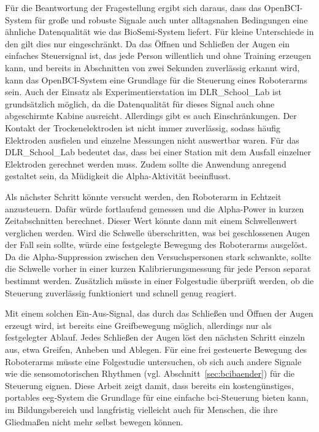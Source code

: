 Für die Beantwortung der Fragestellung ergibt sich daraus, dass das OpenBCI-System für große und robuste Signale auch unter alltagsnahen Bedingungen eine ähnliche Datenqualität wie das BioSemi-System liefert. Für kleine Unterschiede in den  gilt dies nur eingeschränkt. Da das Öffnen und Schließen der Augen ein einfaches Steuersignal ist, das jede Person willentlich und ohne Training erzeugen kann, und bereits in Abschnitten von zwei Sekunden zuverlässig erkannt wird, kann das OpenBCI-System eine Grundlage für die Steuerung eines Roboterarms sein. Auch der Einsatz als Experimentierstation im DLR\_\allowbreak School\_\allowbreak Lab ist grundsätzlich möglich, da die Datenqualität für dieses Signal auch ohne abgeschirmte Kabine ausreicht. Allerdings gibt es auch Einschränkungen. Der Kontakt der Trockenelektroden ist nicht immer zuverlässig, sodass häufig Elektroden ausfielen und einzelne Messungen nicht auswertbar waren. Für das DLR\_\allowbreak School\_\allowbreak Lab bedeutet das, dass bei einer Station mit dem Ausfall einzelner Elektroden gerechnet werden muss. Zudem sollte die Anwendung anregend gestaltet sein, da Müdigkeit die Alpha-Aktivität beeinflusst.

Als nächster Schritt könnte versucht werden, den Roboterarm in Echtzeit anzusteuern. Dafür würde fortlaufend gemessen und die Alpha-Power in kurzen Zeitabschnitten berechnet. Dieser Wert könnte dann mit einem Schwellenwert verglichen werden. Wird die Schwelle überschritten, was bei geschlossenen Augen der Fall sein sollte, würde eine festgelegte Bewegung des Roboterarms ausgelöst. Da die Alpha-Suppression zwischen den Versuchspersonen stark schwankte, sollte die Schwelle vorher in einer kurzen Kalibrierungsmessung für jede Person separat bestimmt werden. Zusätzlich müsste in einer Folgestudie überprüft werden, ob die Steuerung zuverlässig funktioniert und schnell genug reagiert.

Mit einem solchen Ein-Aus-Signal, das durch das Schließen und Öffnen der Augen erzeugt wird, ist bereits eine Greifbewegung möglich, allerdings nur als festgelegter Ablauf. Jedes Schließen der Augen löst den nächsten Schritt einzeln aus, etwa Greifen, Anheben und Ablegen. Für eine frei gesteuerte Bewegung des Roboterarms müsste eine Folgestudie untersuchen, ob sich auch andere Signale wie die sensomotorischen Rhythmen (vgl. Abschnitt~\ref{sec:bcibaender}) für die Steuerung eignen. Diese Arbeit zeigt damit, dass bereits ein kostengünstiges, portables \acrshort{eeg}-System die Grundlage für eine einfache \acrshort{bci}-Steuerung bieten kann, im Bildungsbereich und langfristig vielleicht auch für Menschen, die ihre Gliedmaßen nicht mehr selbst bewegen können.
